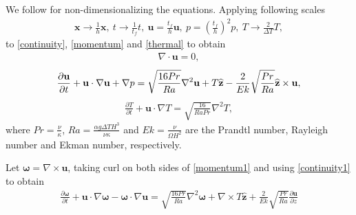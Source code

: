 \documentclass[12pt, a4paper]{article}
\begin{document}
We follow \cite{David15} for non-dimensionalizing the equations. Applying following scales
\begin{align}\label{scales}
\textbf{x}\to \frac{1}{h}\textbf{x},~ t\to\frac{1}{t_f}t,~ \textbf{u} = \frac{t_f}{h}\textbf{u},~ p = \left(\frac{t_f}{h}\right)^2p,~ T\to\frac{2}{\Delta T}T,
\end{align}
to \eqref{continuity}, \eqref{momentum} and \eqref{thermal} to obtain
\begin{align}\label{continuity1}
\nabla\cdot\textbf{u}=0,
\end{align}
\begin{align}\label{momentum1}
\frac{\partial\textbf{u}}{\partial t}+\textbf{u}\cdot\nabla\textbf{u}+\nabla p= \sqrt{\frac{16Pr}{Ra}}\nabla^2\textbf{u}+T \widehat{\bf{z}}-\frac{2}{Ek}\sqrt{\frac{Pr}{Ra}}\bf{\widehat{z}}\times\textbf{u},
\end{align}
\begin{align}\label{thermal1}
\frac{\partial T}{\partial t}+ \textbf{u}\cdot\nabla T=\sqrt{\frac{16}{Ra Pr}}\nabla^2 T,
\end{align}
where $Pr = \frac{\nu}{\kappa}$, $Ra = \frac{\alpha g \Delta T H^3}{\nu \kappa}$ and $Ek = \frac{\nu}{\Omega H^2}$ are the Prandtl number, Rayleigh number and Ekman number, respectively.

Let $\bm{\omega}=\nabla\times\textbf{u}$, taking curl on both sides of \eqref{momentum1}  and using \eqref{continuity1} to obtain 
\begin{align}\label{curl1}
\frac{\partial\bm{\omega}}{\partial t}+\bm{u}\cdot\nabla\bm{\omega}-\bm{\omega}\cdot\nabla\bm{u}=\sqrt{\frac{16Pr}{Ra}}\nabla^2\bm{\omega}+\nabla\times T\widehat{\bm{z}}+\frac{2}{Ek}\sqrt{\frac{Pr}{Ra}}\frac{\partial\bm{u}}{\partial z}
\end{align}
\end{document}

